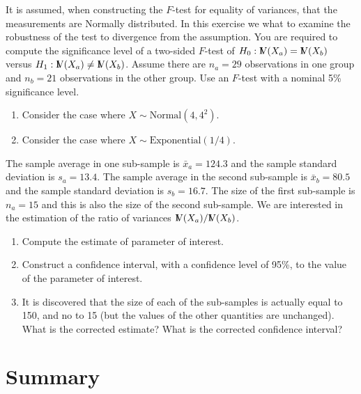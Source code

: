 \documentclass[]{krantz}
\newcommand{\Var}{{\rm I\kern-.3em V}}
\theoremstyle{definition}
\theoremstyle{definition}
\theoremstyle{definition}
\theoremstyle{remark}
\let\BeginKnitrBlock\begin \let\EndKnitrBlock\end
\begin{document}
\BeginKnitrBlock{exercise}
\protect\hypertarget{exr:unnamed-chunk-203}{}{\label{exr:unnamed-chunk-203} }It is assumed, when constructing the \(F\)-test for
equality of variances, that the measurements are Normally distributed.
In this exercise we what to examine the robustness of the test to
divergence from the assumption. You are required to compute the
significance level of a two-sided \(F\)-test of \(H_0:\Var(X_a)=\Var(X_b)\)
versus \(H_1: \Var(X_a)\not =\Var(X_b)\). Assume there are \(n_a=29\)
observations in one group and \(n_b = 21\) observations in the other
group. Use an \(F\)-test with a nominal 5\% significance level.

\begin{enumerate}
\def\labelenumi{\arabic{enumi}.}
\item
  Consider the case where \(X \sim \mathrm{Normal}(4,4^2)\).
\item
  Consider the case where \(X \sim \mathrm{Exponential}(1/4)\).
\end{enumerate}
\EndKnitrBlock{exercise}

\BeginKnitrBlock{exercise}
\protect\hypertarget{exr:unnamed-chunk-204}{}{\label{exr:unnamed-chunk-204} }The sample average in one sub-sample is
\(\bar x_a = 124.3\) and the sample standard deviation is \(s_a = 13.4\).
The sample average in the second sub-sample is \(\bar x_b = 80.5\) and the
sample standard deviation is \(s_b = 16.7\). The size of the first
sub-sample is \(n_a=15\) and this is also the size of the second
sub-sample. We are interested in the estimation of the ratio of
variances \(\Var(X_a)/\Var(X_b)\).

\begin{enumerate}
\def\labelenumi{\arabic{enumi}.}
\item
  Compute the estimate of parameter of interest.
\item
  Construct a confidence interval, with a confidence level of 95\%, to
  the value of the parameter of interest.
\item
  It is discovered that the size of each of the sub-samples is
  actually equal to 150, and no to 15 (but the values of the other
  quantities are unchanged). What is the corrected estimate? What is
  the corrected confidence interval?
\end{enumerate}
\EndKnitrBlock{exercise}

\hypertarget{summary-11}{%
\section{Summary}\label{summary-11}}
\end{document}
